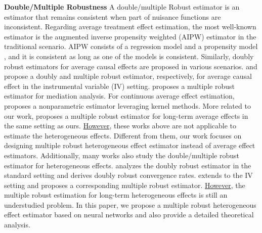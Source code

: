 \textbf{Double/Multiple Robustness}
A double/multiple Robust estimator is an estimator that remains consistent when part of nuisance functions are inconsistent.
Regarding average treatment effect estimation, the most well-known estimator is the augmented inverse propensity weighted (AIPW) estimator \cite{robins1994estimation} in the traditional scenario. 
AIPW consists of a regression model and a propensity model \cite{rosenbaum1983central}, and it is consistent as long as one of the models is consistent.
Similarly, doubly robust estimators for average causal effects are proposed in various scenarios.
\cite{singh2024double} and \cite{wang2018bounded} propose a doubly and multiple robust estimator, respectively, for average causal effect in the instrumental variable (IV) setting.
\cite{tchetgen2012semiparametric} proposes a multiple robust estimator for mediation analysis.
For continuous average effect estimation, \cite{kennedy2017non} proposes a nonparametric estimator leveraging kernel methods.
More related to our work, \cite{ghassami2022combining} proposes a multiple robust estimator for long-term average effects in the same setting as ours. 
\underline{However}, these works above are not applicable to estimate the heterogeneous effects.
Different from them, our work focuses on designing multiple robust heterogeneous effect estimator instead of average effect estimators.
Additionally, many works also study the double/multiple robust estimator for heterogeneous effects.
\cite{kennedy2023towards} analyzes the doubly robust estimator in the standard setting and derives doubly robust convergence rates.
\cite{frauenestimating} extends to the IV setting and proposes a corresponding multiple robust estimator.
\underline{However}, the multiple robust estimation for long-term heterogeneous effects is still an understudied problem. 
In this paper, we propose a multiple robust heterogeneous effect estimator based on neural networks and also provide a detailed theoretical analysis.